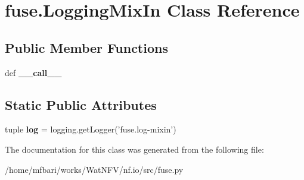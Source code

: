 \hypertarget{classfuse_1_1LoggingMixIn}{\section{fuse.\-Logging\-Mix\-In Class Reference}
\label{classfuse_1_1LoggingMixIn}
}
\subsection*{Public Member Functions}
\begin{DoxyCompactItemize}
\item 
\hypertarget{classfuse_1_1LoggingMixIn_a6c84cd87698901738af26628b7801e82}{def {\bfseries \-\_\-\-\_\-call\-\_\-\-\_\-}}\label{classfuse_1_1LoggingMixIn_a6c84cd87698901738af26628b7801e82}

\end{DoxyCompactItemize}
\subsection*{Static Public Attributes}
\begin{DoxyCompactItemize}
\item 
\hypertarget{classfuse_1_1LoggingMixIn_a86e0fa63f916f123664c84206f69d0e0}{tuple {\bfseries log} = logging.\-get\-Logger('fuse.\-log-\/mixin')}\label{classfuse_1_1LoggingMixIn_a86e0fa63f916f123664c84206f69d0e0}

\end{DoxyCompactItemize}


The documentation for this class was generated from the following file\-:\begin{DoxyCompactItemize}
\item 
/home/mfbari/works/\-Wat\-N\-F\-V/nf.\-io/src/fuse.\-py\end{DoxyCompactItemize}
